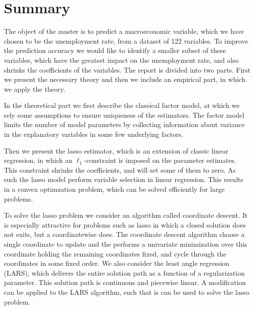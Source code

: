 \chapter{Summary}
%
The object of the master is to predict a macroeconomic variable, which we have chosen to be the unemployment rate, from a dataset of 122 variables.
To improve the prediction accuracy we would like to identify a smaller subset of these variables, which have the greatest impact on the unemployment rate, and also shrinks the coefficients of the variables.
The report is divided into two parts. 
First we present the necessary theory and then we include an empirical part, in which we apply the theory.

In the theoretical part we first describe the classical factor model, at which we rely some assumptions to ensure uniqueness of the estimators.
The factor model limits the number of model parameters by collecting information about variance in the explanatory variables in some few underlying factors.

Then we present the lasso estimator, which is an extension of classic linear regression, in which an \(\ell_1\)-constraint is imposed on the parameter estimates.
This constraint shrinks the coefficients, and will set some of them to zero.
As such the lasso model perform variable selection in linear regression.
This results in a convex optimzation problem, which can be solved efficiently for large problems.

To solve the lasso problem we consider an algorithm called coordinate descent.
It is especially attractive for problems such as lasso in which a closed solution does not exits, but a coordinatewise does.
The coordinate descent algorithm choose a single coordinate to update and the performs a univariate minimization over this coordinate holding the remaining coordinates fixed, and cycle through the coordinates in some fixed order.
We also consider the least angle regression (LARS), which delivers the entire solution path as a function of a regularization parameter.
This solution path is continuous and piecewise linear.
A modification can be applied to the LARS algorithm, such that is can be used to solve the lasso problem.

